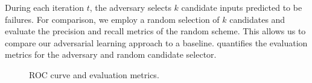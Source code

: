 During each iteration $t$, the adversary selects $k$ candidate inputs predicted to be failures.
For comparison, we employ a random selection of $k$ candidates and evaluate the precision and recall metrics of the random scheme.
This allows us to compare our adversarial learning approach to a baseline.  quantifies the evaluation metrics for the adversary and random candidate selector.



\begin{figure}[t]
    \centering
    \hspace{5mm}
    \caption{ROC curve and evaluation metrics.}
    \label{fig:roc_and_metrics}
\end{figure}



